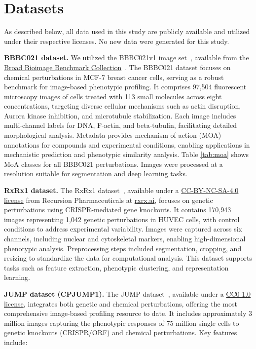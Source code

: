 \newpage
\section{Datasets}
\label{sec:data}
As described below, all data used in this study are publicly available and utilized under their respective licenses. No new data were generated for this study.

\textbf{BBBC021 dataset.}  
We utilized the BBBC021v1 image set~\cite{caie2010high}, available from the \href{https://bbbc.broadinstitute.org/BBBC021}{Broad Bioimage Benchmark Collection}~\cite{ljosa2012annotated}. The BBBC021 dataset focuses on chemical perturbations in MCF-7 breast cancer cells, serving as a robust benchmark for image-based phenotypic profiling. It comprises 97,504 fluorescent microscopy images of cells treated with 113 small molecules across eight concentrations, targeting diverse cellular mechanisms such as actin disruption, Aurora kinase inhibition, and microtubule stabilization. Each image includes multi-channel labels for DNA, F-actin, and beta-tubulin, facilitating detailed morphological analysis. Metadata provides mechanism-of-action (MOA) annotations for compounds and experimental conditions, enabling applications in mechanistic prediction and phenotypic similarity analysis. Table \ref{tab:moa} shows MoA classes for all BBBC021 perturbations. Images were processed at a resolution suitable for segmentation and deep learning tasks.

\textbf{RxRx1 dataset.}  
The RxRx1 dataset~\cite{sypetkowski2023rxrx1}, available under a \href{https://creativecommons.org/licenses/by-nc-sa/4.0/}{CC-BY-NC-SA-4.0 license} from Recursion Pharmaceuticals at \href{https://www.rxrx.ai/rxrx1\#Download}{rxrx.ai}, focuses on genetic perturbations using CRISPR-mediated gene knockouts. It contains 170,943 images representing 1,042 genetic perturbations in HUVEC cells, with control conditions to address experimental variability. Images were captured across six channels, including nuclear and cytoskeletal markers, enabling high-dimensional phenotypic analysis. Preprocessing steps included segmentation, cropping, and resizing to standardize the data for computational analysis. This dataset supports tasks such as feature extraction, phenotypic clustering, and representation learning.

\textbf{JUMP dataset (CPJUMP1).}  
The JUMP dataset~\cite{chandrasekaran2023jump}, available under a \href{https://creativecommons.org/publicdomain/zero/1.0/deed.en}{CC0 1.0 license}, integrates both genetic and chemical perturbations, offering the most comprehensive image-based profiling resource to date. It includes approximately 3 million images capturing the phenotypic responses of 75 million single cells to genetic knockouts (CRISPR/ORF) and chemical perturbations. Key features include:  

